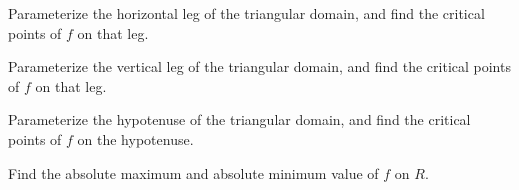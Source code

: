 \begin{activity}
\item Parameterize the horizontal leg of the triangular domain, and
  find the critical points of $f$ on that leg. 
\item Parameterize the vertical leg of the triangular
  domain, and find the critical points of $f$ on that leg. 
	
\item Parameterize the hypotenuse of the triangular domain, and find
  the critical points of $f$ on the hypotenuse. 
	
\item Find the absolute maximum and absolute minimum value of $f$ on
  $R$. 
	

	\ea
\end{activity}
\begin{smallhint}

\end{smallhint}
\begin{bighint}

\end{bighint}

